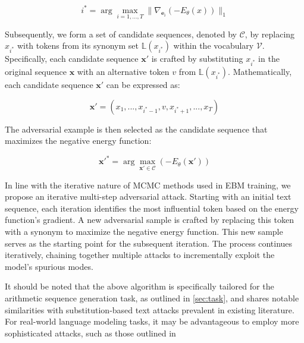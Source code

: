 \documentclass[11pt]{article}
\begin{document}
\begin{equation}
  i^* = \arg\max_{i=1,...,T}\|\nabla_{\mathbf{e}_i} (-E_\theta(x))\|_1
\end{equation}

Subsequently, we form a set of candidate sequences, denoted by \( \mathcal{C} \), by replacing \( x_{i^*} \) with tokens from its synonym set \( \mathbb{L}(x_{i^*}) \) within the vocabulary \( \mathcal{V} \). Specifically, each candidate sequence \( \mathbf{x'} \) is crafted by substituting \( x_{i^*} \) in the original sequence \( \mathbf{x} \) with an alternative token \( v \) from \( \mathbb{L}(x_{i^*}) \). Mathematically, each candidate sequence \( \mathbf{x'} \) can be expressed as:

\begin{equation}
  \mathbf{x'} = (x_1, ..., x_{i^*-1}, v, x_{i^*+1}, ..., x_T)
\end{equation}

The adversarial example is then selected as the candidate sequence that maximizes the negative energy function:

\begin{equation}
  \mathbf{x'}^* = \arg\max_{\mathbf{x'} \in \mathcal{C}} (-E_\theta(\mathbf{x'}))
\end{equation}

In line with the iterative nature of MCMC methods used in EBM training, we propose an iterative multi-step adversarial attack. Starting with an initial text sequence, each iteration identifies the most influential token based on the energy function's gradient. A new adversarial sample is crafted by replacing this token with a synonym to maximize the negative energy function. This new sample serves as the starting point for the subsequent iteration. The process continues iteratively, chaining together multiple attacks to incrementally exploit the model's spurious modes.


It should be noted that the above algorithm  is specifically tailored for the arithmetic sequence generation task, as outlined in \cref{sec:task}, and shares notable similarities with substitution-based text attacks prevalent in existing literature.
For real-world language modeling tasks, it may be advantageous to employ more sophisticated attacks, such as those outlined in \cite{morris2020textattack}
\end{document}
